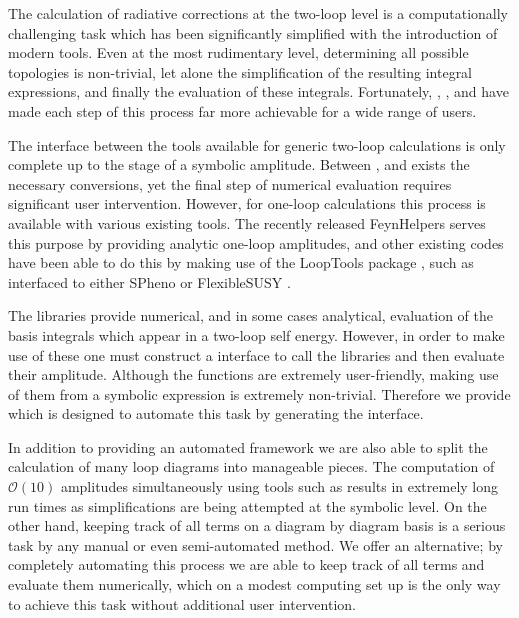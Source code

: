 The calculation of radiative corrections at the two-loop level is a computationally challenging task which has been significantly simplified with the introduction of modern tools.  Even at the most rudimentary level, determining all possible topologies is non-trivial, let alone the simplification of the resulting integral expressions, and finally the evaluation of these integrals.  Fortunately, \feynarts \cite{Hahn2000}, \feyncalc \cite{Mertig1991,Shtabovenko2016}, \tarcer \cite{Mertig1998} and \tsil \cite{Martin2006} have made each step of this process far more achievable for a wide range of users.

The interface between the tools available for generic two-loop calculations is only complete up to the stage of a symbolic amplitude.   Between \feynartss, \feyncalc and \tarcer exists the necessary conversions, yet the final step of numerical evaluation requires significant user intervention.  However, for one-loop calculations this process is available with various existing tools.  The recently released \textsf{FeynHelpers} \cite{Shtabovenko} serves this purpose by providing analytic one-loop amplitudes, and other existing codes have been able to do this by making use of the \textsf{LoopTools} package \cite{LoopTools}, such as \sarah \cite{Staub2014,Staub2015} interfaced to either \textsf{SPheno} \cite{Porod2003} or \textsf{FlexibleSUSY} \cite{Athron2015}.

The \tsil libraries provide numerical, and in some cases analytical, evaluation of the basis integrals which appear in a two-loop self energy.  However, in order to make use of these one must construct a \CC interface to call the \tsil libraries and then evaluate their amplitude.  Although the \tsil functions are extremely user-friendly, making use of them from a symbolic \mathematica expression is extremely non-trivial.  Therefore we provide \mb which is designed to automate this task by generating the \CC interface.

In addition to providing an automated framework we are also able to split the calculation of many loop diagrams into manageable pieces.  The computation of $\mathcal{O}(10)$ amplitudes simultaneously using tools such as \feyncalc results in extremely long run times as simplifications are being attempted at the symbolic level.  On the other hand, keeping track of all terms on a diagram by diagram basis is a serious task by any manual or even semi-automated method.  We offer an alternative; by completely automating this process we are able to keep track of all terms and evaluate them numerically, which on a modest computing set up is the only way to achieve this task without additional user intervention.


